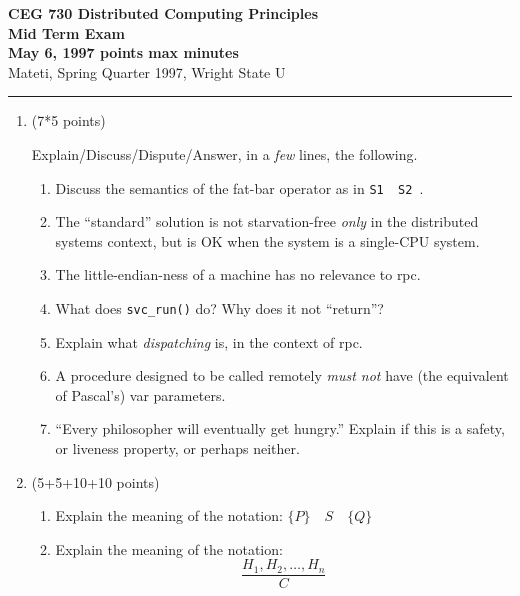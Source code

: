 \documentclass[12pt]{article}
\def\fat{\framebox[1mm]{\rule{0mm}{2mm}}}
\def\RPC{{\sc rpc}}
\begin{document}
{\bf CEG 
\large \bf 730 Distributed Computing Principles\\[5pt]
\large Mid Term Exam\\[10pt]
May 6, 1997  points max  minutes\\
}
\bigskip
{Mateti,  Spring Quarter 1997, Wright State U}\\[-5pt]
\hrule

\begin{enumerate}

\item (7*5 points)

Explain/Discuss/Dispute/Answer, in a {\em few} lines, the following.

\begin{enumerate}

\item
Discuss the semantics of the fat-bar operator as in {\tt S1 \fat\ S2 }.

\item 
The ``standard'' solution  \noindent is not
starvation-free {\em only} in the distributed systems context, but is OK
when the system is a single-CPU system.


\item
The little-endian-ness of a machine has no relevance to \RPC.

\item
What does \verb|svc_run()| do?  Why does it not ``return''?

\item
Explain what {\em dispatching} is, in the context of \RPC.

\item
A procedure designed to be called remotely {\em must not} have
(the equivalent of Pascal's) var parameters.

\item
``Every philosopher will eventually get hungry.''  Explain
if this is a safety, or liveness property, or perhaps neither.
\end{enumerate}


\item (5+5+10+10 points)
\begin{enumerate}
\item
Explain the meaning of the notation: $ \{ P \} \quad S \quad \{ Q \} $

\item
Explain the meaning of the notation:
\[\frac{H_1, H_2, \ldots , H_n}{C}\]



\end{enumerate}
\end{enumerate}
\end{document}
